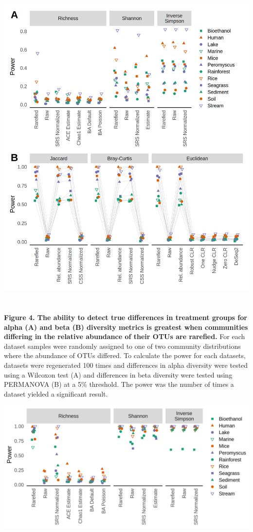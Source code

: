 \documentclass[
]{article}
\begin{document}
\includegraphics[height=17cm]{figure_4.png}

\textbf{Figure 4. The ability to detect true differences in treatment
groups for alpha (A) and beta (B) diversity metrics is greatest when
communities differing in the relative abundance of their OTUs are
rarefied.} For each dataset samples were randomly assigned to one of two
community distributions where the abundance of OTUs differed. To
calculate the power for each datasets, datasets were regenerated 100
times and differences in alpha diversity were tested using a Wilcoxon
test (A) and differences in beta diversity were tested using PERMANOVA
(B) at a 5\% threshold. The power was the number of times a dataset
yielded a significant result.

\newpage

\includegraphics{figure_5.png}
\end{document}
